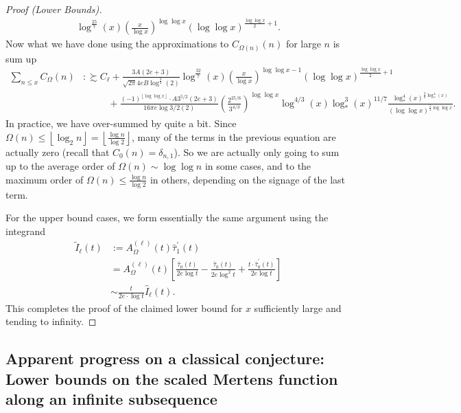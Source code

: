 \documentclass[11pt,reqno,a4letter]{article}
\numberwithin{figure}{section}
\numberwithin{table}{section}
\newcommand{\floor}[1]{\left\lfloor #1 \right\rfloor}
\newcommand{\Floor}[2]{\ensuremath{\left\lfloor \frac{#1}{#2} \right\rfloor}}
\theoremstyle{plain}
\numberwithin{theorem}{section}
\theoremstyle{definition}
\begin{document}
\begin{proof}[Proof (Lower Bounds)]
\begin{align*}
     \log^{\frac{25}{7}}(x) \left( 
     \frac{x}{\log x}\right)^{\log\log x} (\log\log x)^{\frac{\log\log x}{2}+1}. 
\end{align*} 
Now what we have done using the approximations to $C_{\Omega(n)}(n)$ for large $n$ is sum up 
\begin{align*} 
\sum_{n \leq x} C_{\Omega}(n) & :\succsim C_{\ell} + 
     \frac{3A(2e+3)}{\sqrt{2\pi}4eB \log^{\frac{3}{2}}(2)}
     \log^{\frac{32}{7}}(x) \left( 
     \frac{x}{\log x}\right)^{\log\log x-1} (\log\log x)^{\frac{\log\log x}{2}+1} \\ 
     & \phantom{\succsim C_{\ell}\ } + 
     \frac{(-1)^{\floor{\log\log x}} \cdot A 3^{5/2} (2e+3)}{16\pi e \log{3/2}(2)} \left( 
      \frac{2^{25/6}}{3^{4/3}}\right)^{\log\log x} \log^{4/3}(x) \log_{\ast}^3(x)^{11/7} 
      \frac{\log_{\ast}^4(x)^{\frac{3}{2}\log_{\ast}^4(x)}}{(\log\log x)^{\frac{5}{2} \log\log x}}.
\end{align*} 
In practice, we have over-summed by quite a bit. Since $\Omega(n) \leq \floor{\log_2 n} = \Floor{\log n}{\log 2}$, 
many of the terms in the previous equation are actually zero (recall that $C_0(n) = \delta_{n,1}$). 
So we are actually only going to sum up to the average order of 
$\Omega(n) \sim \log\log n$ in some cases, and to the maximum order of $\Omega(n) \leq \frac{\log n}{\log 2}$ in 
others, depending on the signage of the last term. 

For the upper bound cases, we form essentially the same argument using the integrand 
\begin{align*} 
\widetilde{I}_{\ell}(t) & := A_{\Omega}^{(\ell)}(t) \widehat{\tau}_1^{\prime}(t) \\ 
     & = A_{\Omega}^{(\ell)}(t) \left[\frac{\widehat{\tau}_0(t)}{2e \log t} - 
     \frac{\widehat{\tau}_0(t)}{2e \log^2 t} + 
     \frac{t \cdot \widehat{\tau}_0^{\prime}(t)}{2e \log t}\right] \\ 
     & \sim \frac{t}{2e \cdot \log t} \widehat{I}_{\ell}(t). 
\end{align*} 
This completes the proof of the claimed lower bound for $x$ sufficiently large and tending to infinity. 
\end{proof} 

\subsection{Apparent progress on a classical conjecture: 
            Lower bounds on the scaled Mertens function along an infinite subsequence}
\end{document}
